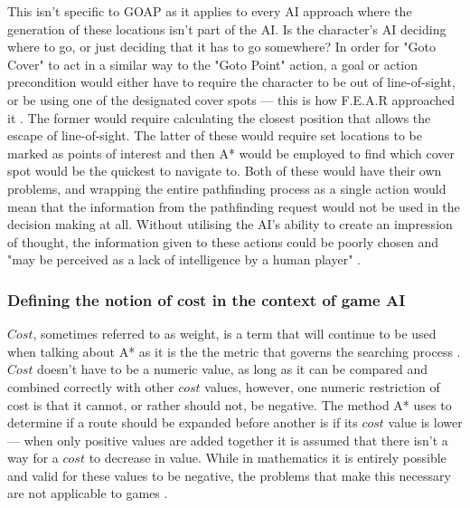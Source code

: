 \documentclass[11pt, a4paper]{article}
\begin{document}
This isn't specific to GOAP as it applies to every AI approach where the generation of these locations isn't part of the AI. Is the character's AI deciding where to go, or just deciding that it has to go somewhere? In order for "Goto Cover" to act in a similar way to the "Goto Point" action, a goal or action precondition would either have to require the character to be out of line-of-sight, or be using one of the designated cover spots --- this is how F.E.A.R \parencite*{FEAR} approached it \parencite[12]{orkin2006three}. The former would require calculating the closest position that allows the escape of line-of-sight. The latter of these would require set locations to be marked as points of interest and then A* would be employed to find which cover spot would be the quickest to navigate to. Both of these would have their own problems, and wrapping the entire pathfinding process as a single action would mean that the information from the pathfinding request would not be used in the decision making at all. Without utilising the AI's ability to create an impression of thought, the information given to these actions could be poorly chosen and "may be perceived as a lack of intelligence by a human player" \parencite[63]{graham2003pathfinding}.

\subsubsection{Defining the notion of cost in the context of game AI}
\label{subsubsec:definingTheNotionOfCost}

$Cost$, sometimes referred to as weight, is a term that will continue to be used when talking about A* as it is the the metric that governs the searching process \parencite[60]{graham2003pathfinding}. $Cost$ doesn't have to be a numeric value, as long as it can be compared and combined correctly with other $cost$ values, however, one numeric restriction of cost is that it cannot, or rather should not, be negative. The method A* uses to determine if a route should be expanded before another is if its $cost$ value is lower --- when only positive values are added together it is assumed that there isn't a way for a $cost$ to decrease in value. While in mathematics it is entirely possible and valid for these values to be negative, the problems that make this necessary are not applicable to games \parencite[202]{millington2019ai}.
\end{document}

